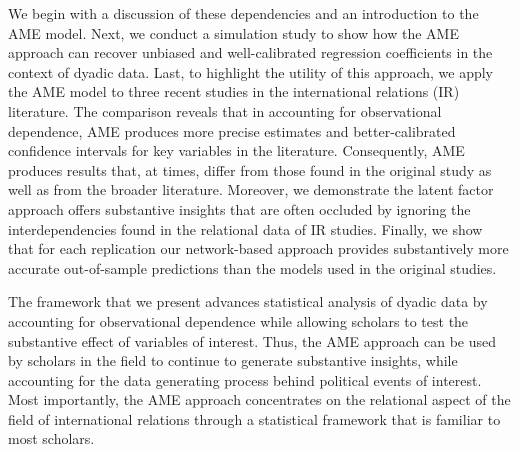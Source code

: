 We begin with a discussion of these dependencies and an introduction to the AME model. Next, we conduct a simulation study to show how the AME approach can recover unbiased and well-calibrated regression coefficients in the context of dyadic data. Last, to highlight the utility of this approach, we apply the AME model to three recent studies in the international relations (IR) literature. The comparison reveals that in accounting for observational dependence, AME produces more precise estimates and better-calibrated confidence intervals for key variables in the literature. Consequently, AME produces results that, at times, differ from those found in the original study as well as from the broader literature. Moreover, we demonstrate the latent factor approach offers substantive insights that are often occluded by ignoring the interdependencies found in the relational data of IR studies. Finally, we show that for each replication our network-based approach provides substantively more accurate out-of-sample predictions than the models used in the original studies. 

The framework that we present advances statistical analysis of dyadic data by accounting for observational dependence while allowing scholars to test the substantive effect of variables of interest. Thus, the AME approach can be used by scholars in the field to continue to generate substantive insights, while accounting for the data generating process behind political events of interest. Most importantly, the AME approach concentrates on the relational aspect of the field of international relations through a statistical framework that is familiar to most scholars.